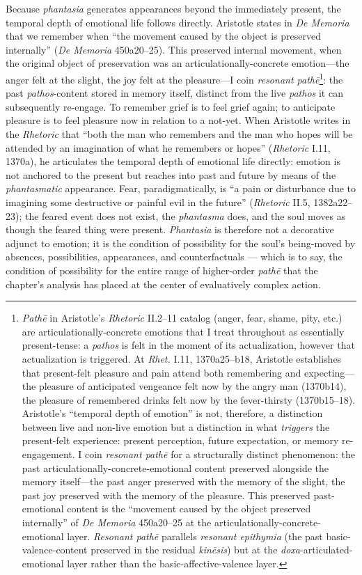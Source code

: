 \documentclass{article}
\begin{document}
Because \textit{phantasia} generates appearances beyond the immediately present, the temporal depth of emotional life follows directly. Aristotle states in \textit{De Memoria} that we remember when ``the movement caused by the object is preserved internally'' (\textit{De Memoria} 450a20--25). This preserved internal movement, when the original object of preservation was an articulationally-concrete emotion---the anger felt at the slight, the joy felt at the pleasure---I coin \textit{resonant pathē}\footnote{\textit{Pathē} in Aristotle's \textit{Rhetoric} II.2--11 catalog (anger, fear, shame, pity, etc.) are articulationally-concrete emotions that I treat throughout as essentially present-tense: a \textit{pathos} is felt in the moment of its actualization, however that actualization is triggered. At \textit{Rhet.} I.11, 1370a25--b18, Aristotle establishes that present-felt pleasure and pain attend both remembering and expecting---the pleasure of anticipated vengeance felt now by the angry man (1370b14), the pleasure of remembered drinks felt now by the fever-thirsty (1370b15--18). Aristotle's ``temporal depth of emotion'' is not, therefore, a distinction between live and non-live emotion but a distinction in what \textit{triggers} the present-felt experience: present perception, future expectation, or memory re-engagement. I coin \textit{resonant pathē} for a structurally distinct phenomenon: the past articulationally-concrete-emotional content preserved alongside the memory itself---the past anger preserved with the memory of the slight, the past joy preserved with the memory of the pleasure. This preserved past-emotional content is the ``movement caused by the object preserved internally'' of \textit{De Memoria} 450a20--25 at the articulationally-concrete-emotional layer. \textit{Resonant pathē} parallels \textit{resonant epithymia} (the past basic-valence-content preserved in the residual \textit{kinēsis}) but at the \textit{doxa}-articulated-emotional layer rather than the basic-affective-valence layer.}: the past \textit{pathos}-content stored in memory itself, distinct from the live \textit{pathos} it can subsequently re-engage. To remember grief is to feel grief again; to anticipate pleasure is to feel pleasure now in relation to a not-yet. When Aristotle writes in the \textit{Rhetoric} that ``both the man who remembers and the man who hopes will be attended by an imagination of what he remembers or hopes'' (\textit{Rhetoric} I.11, 1370a), he articulates the temporal depth of emotional life directly: emotion is not anchored to the present but reaches into past and future by means of the \textit{phantasmatic} appearance. Fear, paradigmatically, is ``a pain or disturbance due to imagining some destructive or painful evil in the future'' (\textit{Rhetoric} II.5, 1382a22--23); the feared event does not exist, the \textit{phantasma} does, and the soul moves as though the feared thing were present. \textit{Phantasia} is therefore not a decorative adjunct to emotion; it is the condition of possibility for the soul's being-moved by absences, possibilities, appearances, and counterfactuals --- which is to say, the condition of possibility for the entire range of higher-order \textit{pathē} that the chapter's analysis has placed at the center of evaluatively complex action.
\end{document}
